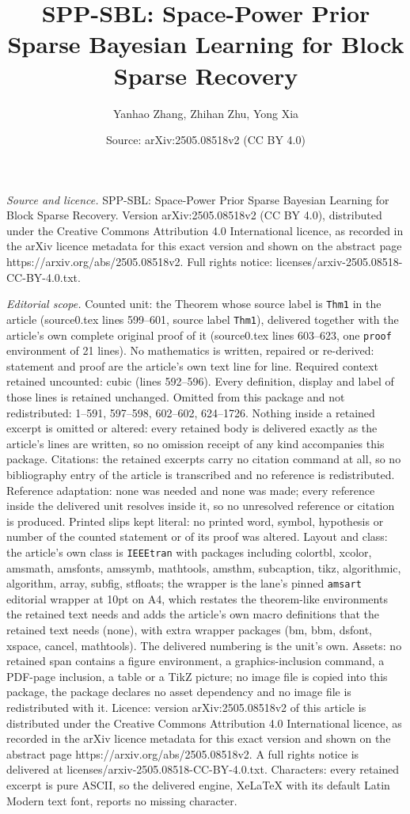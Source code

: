 \documentclass[10pt,a4paper]{amsart}
\title[SPP-SBL: Space-Power Prior Sparse Bayesian Learning for Bloc]{SPP-SBL: Space-Power Prior Sparse Bayesian Learning for Block Sparse Recovery}
\author{Yanhao Zhang, Zhihan Zhu, Yong Xia}
\date{Source: arXiv:2505.08518v2 (CC BY 4.0)}
\begin{document}
\maketitle

\noindent\emph{Source and licence.} SPP-SBL: Space-Power Prior Sparse Bayesian Learning for Block Sparse Recovery. Version arXiv:2505.08518v2 (CC BY 4.0), distributed under the Creative Commons Attribution 4.0 International licence, as recorded in the arXiv licence metadata for this exact version and shown on the abstract page https://arxiv.org/abs/2505.08518v2. Full rights notice: licenses/arxiv-2505.08518-CC-BY-4.0.txt.\par\smallskip

\noindent\textit{Editorial scope.} Counted unit: the Theorem whose source label is \texttt{Thm1} in the article (source0.tex lines 599--601, source label \texttt{Thm1}), delivered together with the article's own complete original proof of it (source0.tex lines 603--623, one \texttt{proof} environment of 21 lines). No mathematics is written, repaired or re-derived: statement and proof are the article's own text line for line. Required context retained uncounted: cubic (lines 592--596). Every definition, display and label of those lines is retained unchanged. Omitted from this package and not redistributed: 1--591, 597--598, 602--602, 624--1726. Nothing inside a retained excerpt is omitted or altered: every retained body is delivered exactly as the article's lines are written, so no omission receipt of any kind accompanies this package. Citations: the retained excerpts carry no citation command at all, so no bibliography entry of the article is transcribed and no reference is redistributed. Reference adaptation: none was needed and none was made; every reference inside the delivered unit resolves inside it, so no unresolved reference or citation is produced. Printed slips kept literal: no printed word, symbol, hypothesis or number of the counted statement or of its proof was altered. Layout and class: the article's own class is \texttt{IEEEtran} with packages including colortbl, xcolor, amsmath, amsfonts, amssymb, mathtools, amsthm, subcaption, tikz, algorithmic, algorithm, array, subfig, stfloats; the wrapper is the lane's pinned \texttt{amsart} editorial wrapper at 10pt on A4, which restates the theorem-like environments the retained text needs and adds the article's own macro definitions that the retained text needs (none), with extra wrapper packages (bm, bbm, dsfont, xspace, cancel, mathtools). The delivered numbering is the unit's own. Assets: no retained span contains a figure environment, a graphics-inclusion command, a PDF-page inclusion, a table or a TikZ picture; no image file is copied into this package, the package declares no asset dependency and no image file is redistributed with it. Licence: version arXiv:2505.08518v2 of this article is distributed under the Creative Commons Attribution 4.0 International licence, as recorded in the arXiv licence metadata for this exact version and shown on the abstract page https://arxiv.org/abs/2505.08518v2. A full rights notice is delivered at licenses/arxiv-2505.08518-CC-BY-4.0.txt. Characters: every retained excerpt is pure ASCII, so the delivered engine, XeLaTeX with its default Latin Modern text font, reports no missing character.
\end{document}
